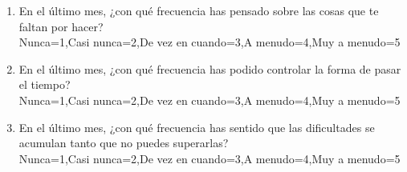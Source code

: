 \documentclass{article}
\begin{document}
{\begin{Form}
\begin{enumerate}
        \item En el último mes, ¿con qué frecuencia has pensado sobre las cosas que te faltan por hacer?\\
              \ChoiceMenu[radio, name=respuesta12, radiosymbol=\ding{108}]{}
              {Nunca=1,Casi nunca=2,De vez en cuando=3,A menudo=4,Muy a menudo=5}\\

        \item En el último mes, ¿con qué frecuencia has podido controlar la forma de pasar el tiempo?\\
              \ChoiceMenu[radio, name=respuesta13, radiosymbol=\ding{108}]{}
              {Nunca=1,Casi nunca=2,De vez en cuando=3,A menudo=4,Muy a menudo=5}\\

        \item En el último mes, ¿con qué frecuencia has sentido que las dificultades se acumulan tanto que no puedes superarlas?\\
              \ChoiceMenu[radio, name=respuesta14, radiosymbol=\ding{108}]{}
              {Nunca=1,Casi nunca=2,De vez en cuando=3,A menudo=4,Muy a menudo=5}\\
    \end{enumerate}
    \vspace{0.2cm}

    \TextField[name=salida,width=10cm,height=2.8cm,multiline=true,readonly=true]{}
    \end{Form}
    
    \vspace{0.2cm} 
     
}
\end{document}
